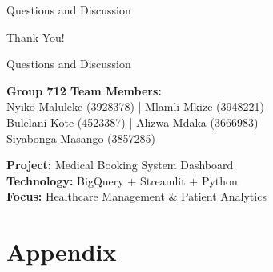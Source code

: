 \documentclass[aspectratio=169]{beamer}
\begin{document}
\begin{frame}{Questions and Discussion}
\begin{center}
\Huge Thank You!

\vspace{1cm}

\Large Questions and Discussion

\vspace{1cm}

\normalsize
\textbf{Group 712 Team Members:}\\
Nyiko Maluleke (3928378) | Mlamli Mkize (3948221)\\
Bulelani Kote (4523387) | Alizwa Mdaka (3666983)\\
Siyabonga Masango (3857285)

\vspace{0.5cm}
\textbf{Project:} Medical Booking System Dashboard\\
\textbf{Technology:} BigQuery + Streamlit + Python\\
\textbf{Focus:} Healthcare Management \& Patient Analytics
\end{center}
\end{frame}

\appendix
\section{Appendix}
\end{document}
